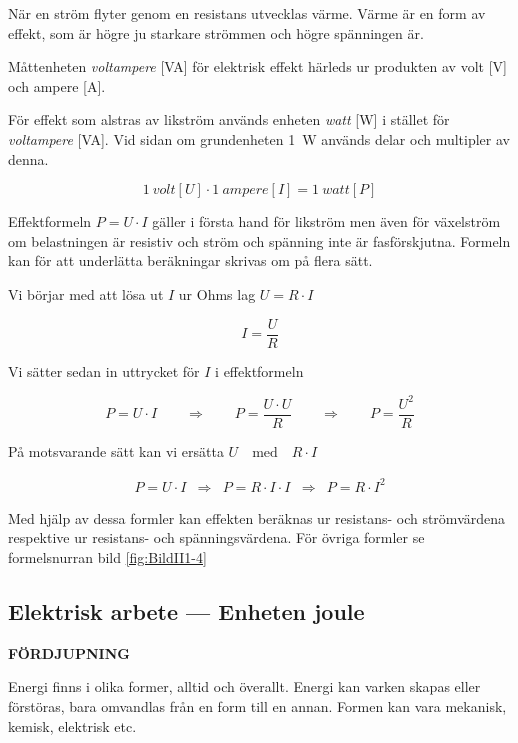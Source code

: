 När en ström flyter genom en resistans utvecklas värme.
Värme är en form av effekt, som är högre ju starkare strömmen och högre
spänningen är.

Måttenheten \emph{voltampere} [VA] för elektrisk effekt härleds ur
produkten av volt [V] och ampere [A].

För effekt som alstras av likström används enheten \emph{watt} [W]
\cite{SIbrochure8} i stället för \emph{voltampere} [VA].
Vid sidan om grundenheten \SI{1}{W} används delar och multipler av
denna.

\begin{equation*}
	\SI{1}{volt} \unit{[U]} \cdot \SI{1}{ampere [I]} = \SI{1}{watt [P]}
\end{equation*}

Effektformeln \(P = U \cdot I\) gäller i första hand för likström men även för
växelström om belastningen är resistiv och ström och spänning inte är
fasförskjutna.
Formeln kan för att underlätta beräkningar skrivas om på flera sätt.

Vi börjar med att lösa ut \(I\) ur Ohms lag \(U = R \cdot I\) 

\[
	I = \frac{U}{R}
\]

Vi sätter sedan in uttrycket för \(I\) i effektformeln

\[
	P=U \cdot I \qquad \Rightarrow \qquad P= \dfrac{U \cdot U}{R} \qquad
	\Rightarrow \qquad P= \dfrac{U^2}{R}
\]

På motsvarande sätt kan vi ersätta \(U \quad\text{med}\quad R \cdot I\)

\[ \begin{array}{lllll}
P=U \cdot I & \Rightarrow & P = R \cdot I \cdot I  & \Rightarrow & P = R \cdot I^2
\end{array} \]


Med hjälp av dessa formler kan effekten beräknas ur resistans- och strömvärdena
respektive ur resistans- och spänningsvärdena.
För övriga formler se formelsnurran bild \ref{fig:BildII1-4}

\subsection{Elektrisk arbete --- Enheten joule}
\textbf{FÖRDJUPNING}

Energi finns i olika former, alltid och överallt.
Energi kan varken skapas eller förstöras, bara omvandlas från en form till en
annan.
Formen kan vara mekanisk, kemisk, elektrisk etc.

